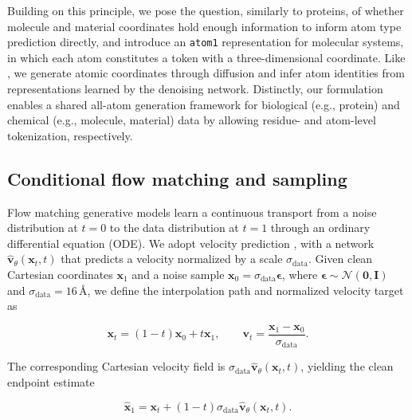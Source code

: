 \documentclass{article} %
\begin{document}
Building on this principle, we pose the question, similarly to proteins, of whether molecule and material coordinates hold enough information to inform atom type prediction directly, and introduce an \texttt{atom1} representation for molecular systems, in which each atom constitutes a token with a three-dimensional coordinate. Like \citet{feng2025unigem}, we generate atomic coordinates through diffusion and infer atom identities from representations learned by the denoising network. Distinctly, our formulation enables a shared all-atom generation framework for biological (e.g., protein) and chemical (e.g., molecule, material) data by allowing residue- and atom-level tokenization, respectively.



\subsection{Conditional flow matching and sampling}
\label{sec:zatom2-flow}

Flow matching generative models \citep{lipman2023flow,albergo} learn a continuous transport from a noise distribution at $t=0$ to the data distribution at $t=1$ through an ordinary differential equation (ODE). We adopt velocity prediction \citep{simplefold,laproteina}, with a network $\widehat{\mathbf{v}}_\theta(\mathbf{x}_t,t)$ that predicts a velocity normalized by a scale $\sigma_{\mathrm{data}}$. Given clean Cartesian coordinates $\mathbf{x}_1$ and a noise sample $\mathbf{x}_0=\sigma_{\mathrm{data}}\boldsymbol{\epsilon}$, where $\boldsymbol{\epsilon}\sim\mathcal{N}(\mathbf{0},\mathbf{I})$ and $\sigma_{\mathrm{data}}=16\,\text{\AA}$, we define the interpolation path and normalized velocity target as

\begin{equation}
\mathbf{x}_t=(1-t)\mathbf{x}_0+t\mathbf{x}_1,
\qquad
\mathbf{v}_t=
\frac{\mathbf{x}_1-\mathbf{x}_0}{\sigma_{\mathrm{data}}}.
\label{eq:zatom2-flow}
\end{equation}

The corresponding Cartesian velocity field is
$\sigma_{\mathrm{data}}\widehat{\mathbf{v}}_\theta(\mathbf{x}_t,t)$,
yielding the clean endpoint estimate

\begin{equation}
\widehat{\mathbf{x}}_1
=
\mathbf{x}_t
+
(1-t)\sigma_{\mathrm{data}}
\widehat{\mathbf{v}}_\theta(\mathbf{x}_t,t).
\label{eq:zatom2-endpoint}
\end{equation}
\end{document}
